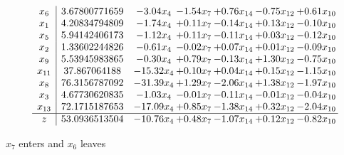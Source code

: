\documentclass[9pt]{article}
\begin{document}
 \[\begin{array}{c| c c@{\hskip 2pt} c@{\hskip 2pt} c@{\hskip 2pt} c@{\hskip 2pt} c@{\hskip 2pt} }
 x_{6}   &  3.67800771659 & -3.04 x_{4} & -1.54 x_{7} & +  0.76 x_{14} & -0.75 x_{12} & +  0.61 x_{10}\\
 x_{1}   &  4.20834794809 & -1.74 x_{4} & +  0.11 x_{7} & -0.14 x_{14} & +  0.13 x_{12} & -0.10 x_{10}\\
 x_{5}   &  5.94142406173 & -1.12 x_{4} & +  0.11 x_{7} & -0.11 x_{14} & +  0.03 x_{12} & -0.12 x_{10}\\
 x_{2}   &  1.33602244826 & -0.61 x_{4} & -0.02 x_{7} & +  0.07 x_{14} & +  0.01 x_{12} & -0.09 x_{10}\\
 x_{9}   &  5.53945983865 & -0.30 x_{4} & +  0.79 x_{7} & -0.13 x_{14} & +  1.30 x_{12} & -0.75 x_{10}\\
 x_{11}   &  37.867064188 & -15.32 x_{4} & +  0.10 x_{7} & +  0.04 x_{14} & +  0.15 x_{12} & -1.15 x_{10}\\
 x_{8}   &  76.3156787092 & -31.39 x_{4} & +  1.29 x_{7} & -2.06 x_{14} & +  1.38 x_{12} & -1.97 x_{10}\\
 x_{3}   &  4.67730620835 & -1.03 x_{4} & -0.01 x_{7} & -0.11 x_{14} & -0.01 x_{12} & -0.04 x_{10}\\
 x_{13}   &  72.1715187653 & -17.09 x_{4} & +  0.85 x_{7} & -1.38 x_{14} & +  0.32 x_{12} & -2.04 x_{10}\\
\hline
z    &  53.0936513504 & -10.76 x_{4} & +  0.48 x_{7} & -1.07 x_{14} & +  0.12 x_{12} & -0.82 x_{10}\\
\end{array}\]


 $ x_{7} $ enters and $ x_{6} $ leaves 
\end{document}
